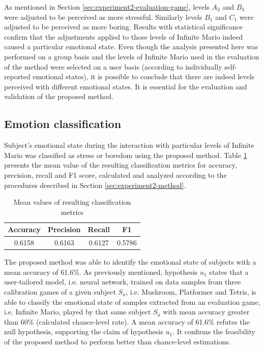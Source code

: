 As mentioned in Section \ref{sec:experiment2-evaluation-game}, levels $A_3$ and $B_3$ were adjusted to be perceived as more stressful. Similarly levels $B_1$ and $C_1$ were adjusted to be perceived as more boring. Results with statistical significance confirm that the adjustments applied to those levels of Infinite Mario indeed caused a particular emotional state. Even though the analysis presented here was performed on a group basis and the levels of Infinite Mario used in the evaluation of the method were selected on a user basis (according to individually self-reported emotional states), it is possible to conclude that there are indeed levels perceived with different emotional states. It is essential for the evaluation and validation of the proposed method.

\subsection{Emotion classification}

Subject's emotional state during the interaction with particular levels of Infinite Mario was classified as stress or boredom using the proposed method. Table \ref{table:experiment2-result-metrics-mean} presents the mean value of the resulting classification metrics for accuracy, precision, recall and F1 score, calculated and analyzed according to the procedures described in Section \ref{sec:experiment2-method}.

\begin{table}[ht]
    \centering
    \caption{Mean values of resulting classification metrics}
    \label{table:experiment2-result-metrics-mean}
    \begin{tabular}[l]{@{}cccc}
        \toprule%
            \textbf{Accuracy} & \textbf{Precision} & \textbf{Recall} & \textbf{F1}\\
        \midrule%
            0.6158 & 0.6163 & 0.6127 & 0.5786 \\ %
        \bottomrule%
    \end{tabular}
\end{table}

The proposed method was able to identify the emotional state of subjects with a mean accuracy of 61.6\%. As previously mentioned, hypothesis $u_1$ states that a user-tailored model, i.e. neural network, trained on data samples from three calibration games of a given subject $S_a$, i.e. Mushroom, Platformer and Tetris, is able to classify the emotional state of samples extracted from an evaluation game, i.e. Infinite Mario, played by that same subject $S_a$ with mean accuracy greater than 60\% (calculated chance-level rate). A mean accuracy of 61.6\% refutes the null hypothesis, supporting the claim of hypothesis $u_1$. It confirms the feasibility of the proposed method to perform better than chance-level estimations.

